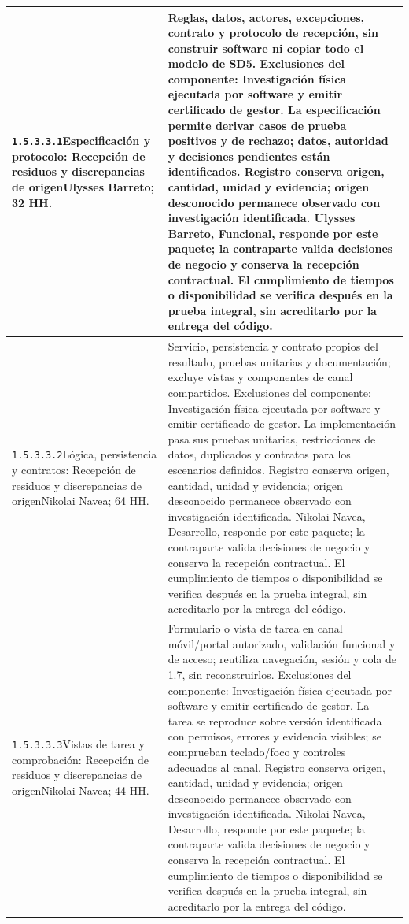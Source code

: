 \begin{longtable}{L{52mm}L{91mm}}
\texttt{1.\allowbreak{}5.\allowbreak{}3.\allowbreak{}3.\allowbreak{}1}\newline Especificación y protocolo: Recepción de residuos y discrepancias de origen\newline Ulysses Barreto; 32 HH. & Reglas, datos, actores, excepciones, contrato y protocolo de recepción, sin construir software ni copiar todo el modelo de SD5. Exclusiones del componente: Investigación física ejecutada por software y emitir certificado de gestor. La especificación permite derivar casos de prueba positivos y de rechazo; datos, autoridad y decisiones pendientes están identificados. Registro conserva origen, cantidad, unidad y evidencia; origen desconocido permanece observado con investigación identificada. Ulysses Barreto, Funcional, responde por este paquete; la contraparte valida decisiones de negocio y conserva la recepción contractual. El cumplimiento de tiempos o disponibilidad se verifica después en la prueba integral, sin acreditarlo por la entrega del código.\\\hline
\texttt{1.\allowbreak{}5.\allowbreak{}3.\allowbreak{}3.\allowbreak{}2}\newline Lógica, persistencia y contratos: Recepción de residuos y discrepancias de origen\newline Nikolai Navea; 64 HH. & Servicio, persistencia y contrato propios del resultado, pruebas unitarias y documentación; excluye vistas y componentes de canal compartidos. Exclusiones del componente: Investigación física ejecutada por software y emitir certificado de gestor. La implementación pasa sus pruebas unitarias, restricciones de datos, duplicados y contratos para los escenarios definidos. Registro conserva origen, cantidad, unidad y evidencia; origen desconocido permanece observado con investigación identificada. Nikolai Navea, Desarrollo, responde por este paquete; la contraparte valida decisiones de negocio y conserva la recepción contractual. El cumplimiento de tiempos o disponibilidad se verifica después en la prueba integral, sin acreditarlo por la entrega del código.\\\hline
\texttt{1.\allowbreak{}5.\allowbreak{}3.\allowbreak{}3.\allowbreak{}3}\newline Vistas de tarea y comprobación: Recepción de residuos y discrepancias de origen\newline Nikolai Navea; 44 HH. & Formulario o vista de tarea en canal móvil/portal autorizado, validación funcional y de acceso; reutiliza navegación, sesión y cola de 1.7, sin reconstruirlos. Exclusiones del componente: Investigación física ejecutada por software y emitir certificado de gestor. La tarea se reproduce sobre versión identificada con permisos, errores y evidencia visibles; se comprueban teclado/foco y controles adecuados al canal. Registro conserva origen, cantidad, unidad y evidencia; origen desconocido permanece observado con investigación identificada. Nikolai Navea, Desarrollo, responde por este paquete; la contraparte valida decisiones de negocio y conserva la recepción contractual. El cumplimiento de tiempos o disponibilidad se verifica después en la prueba integral, sin acreditarlo por la entrega del código.\\\hline

\end{longtable}
